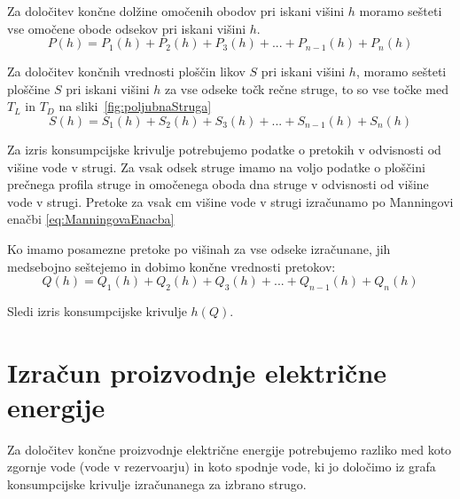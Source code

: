 Za določitev končne dolžine omočenih obodov pri iskani višini $h$ moramo sešteti vse omočene obode odsekov pri iskani višini $h$.
\begin{equation}
P(h) = P_1(h) + P_2(h) + P_3(h) + ... + P_{n-1}(h) + P_n(h)
\end{equation}


Za določitev končnih vrednosti ploščin likov $S$ pri iskani višini $h$, moramo sešteti ploščine $S$ pri iskani višini $h$ za vse odseke točk rečne struge, to so vse točke med $T_L$ in $T_D$ na sliki~\ref{fig:poljubnaStruga}
\begin{equation}
S(h) = S_1(h) + S_2(h) + S_3(h) + ... + S_{n-1}(h) + S_n(h)
\end{equation}





Za izris konsumpcijske krivulje potrebujemo podatke o pretokih v odvisnosti od višine vode v strugi. Za vsak odsek struge imamo na voljo podatke o ploščini prečnega profila struge in omočenega oboda dna struge v odvisnosti od višine vode v strugi. Pretoke za vsak cm višine vode v strugi izračunamo po Manningovi enačbi \ref{eq:ManningovaEnacba}


Ko imamo posamezne pretoke po višinah za vse odseke izračunane, jih medsebojno seštejemo in dobimo končne vrednosti pretokov:
\begin{equation}
Q(h) = Q_1(h) + Q_2(h) + Q_3(h) + ... + Q_{n-1}(h) + Q_n(h)
\end{equation}

Sledi izris konsumpcijske krivulje $h(Q)$.




\newpage



\section{Izračun proizvodnje električne energije}
Za določitev končne proizvodnje električne energije potrebujemo razliko med koto zgornje vode (vode v rezervoarju) in koto spodnje vode, ki jo določimo iz grafa konsumpcijske krivulje izračunanega za izbrano strugo.

